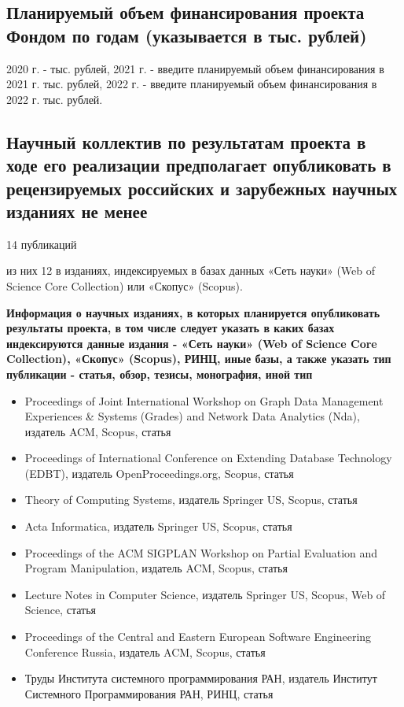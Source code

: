 \documentclass[12pt]{article}  %
\theoremstyle{remark}
\begin{document}
\subsection{Планируемый объем финансирования проекта Фондом по годам (указывается в тыс. рублей)}
2020 г. - тыс. рублей,
2021 г. - введите планируемый объем финансирования в 2021 г. тыс. рублей,
2022 г. - введите планируемый объем финансирования в 2022 г. тыс. рублей.

\subsection{Научный коллектив по результатам проекта в ходе его реализации предполагает опубликовать в рецензируемых российских и зарубежных научных изданиях не менее}

14 публикаций

из них 12 в изданиях, индексируемых в базах данных «Сеть науки» (Web of Science Core Collection) или «Скопус» (Scopus).

\textbf{Информация о научных изданиях, в которых планируется опубликовать результаты проекта, в том числе следует указать в каких базах индексируются данные издания - «Сеть науки» (Web of Science Core Collection), «Скопус» (Scopus), РИНЦ, иные базы, а также указать тип публикации - статья, обзор, тезисы, монография, иной тип}
\begin{itemize}
  \item Proceedings of Joint International Workshop on Graph Data Management Experiences \& Systems (Grades) and Network Data Analytics (Nda), издатель  ACM, Scopus, статья
  \item Proceedings of International Conference on Extending Database Technology (EDBT), издатель OpenProceedings.org, Scopus, статья
  \item Theory of Computing Systems, издатель Springer US, Scopus, статья
  \item Acta Informatica, издатель Springer US, Scopus, статья
  \item Proceedings of the ACM SIGPLAN Workshop on Partial Evaluation and Program Manipulation, издатель  ACM, Scopus, статья
  \item Lecture Notes in Computer Science, издатель Springer US, Scopus, Web of Science, статья
  \item Proceedings of the Central and Eastern European Software Engineering Conference Russia, издатель  ACM, Scopus, статья
  \item Труды Института системного программирования РАН, издатель Институт Системного Программирования РАН, РИНЦ, статья
\end{itemize}
\end{document}
